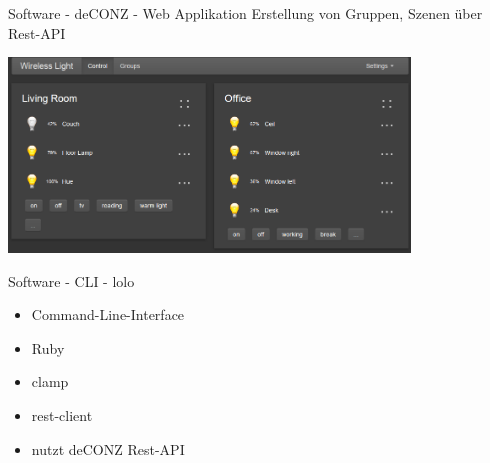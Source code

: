 \begin{frame}{Software - deCONZ - Web Applikation}
  \Large
  Erstellung von Gruppen, Szenen über Rest-API

  \begin{center}
    \includegraphics[width=0.8\textwidth]{images/deconz_web}
  \end{center}
\end{frame}

\begin{frame}{Software - CLI - lolo}
  \Large
  \begin{itemize}
    \item Command-Line-Interface
    \item Ruby
    \item clamp
    \item rest-client
    \item nutzt deCONZ Rest-API
  \end{itemize}
\end{frame}
